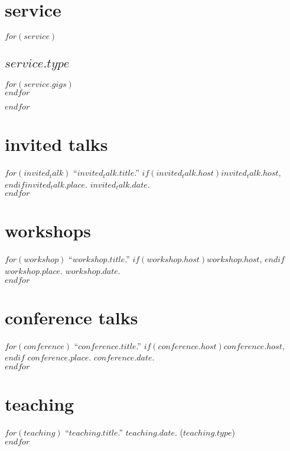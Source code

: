 \documentclass[11pt, a4paper]{article}
\begin{document}
\section{service}
$for(service)$
  \subsection{$service.type$}
  \begin{separator}
  $for(service.gigs)$
    \\
    \vspace{.75ex}
  $endfor$
  \end{separator}
$endfor$

\section{invited talks}

$for(invited_talk)$
``$invited_talk.title$.'' $if(invited_talk.host)$$invited_talk.host$, $endif$$invited_talk.place$. $invited_talk.date$.\\[.15cm]
$endfor$


\section{workshops}

$for(workshop)$
``$workshop.title$.''
$if(workshop.host)$$workshop.host$, $endif$$workshop.place$.
$workshop.date$.\\[.15cm]
$endfor$

\section{conference talks}

$for(conference)$
``$conference.title$.''
$if(conference.host)$$conference.host$, $endif$
$conference.place$.
$conference.date$.\\[.15cm]
$endfor$

\section{teaching}

$for(teaching)$
``$teaching.title$.'' $teaching.date$. ($teaching.type$)\\[.15cm]
$endfor$
\end{document}
